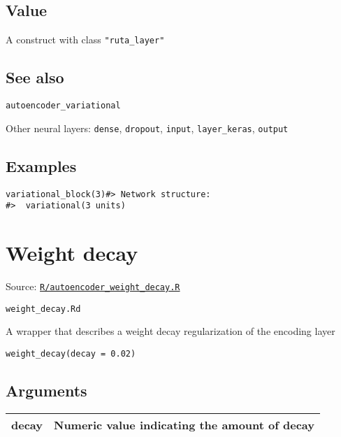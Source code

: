 \hypertarget{value}{\subsection{\texorpdfstring{\protect\hyperlink{value}{}Value}{Value}}\label{value}}

A construct with class \texttt{"ruta\_layer"}

\hypertarget{see-also}{\subsection{\texorpdfstring{\protect\hyperlink{see-also}{}See
also}{See also}}\label{see-also}}

\texttt{autoencoder\_variational}

Other neural layers: \texttt{dense}, \texttt{dropout}, \texttt{input},
\texttt{layer\_keras}, \texttt{output}

\hypertarget{examples}{\subsection{\texorpdfstring{\protect\hyperlink{examples}{}Examples}{Examples}}\label{examples}}

\begin{verbatim}
variational_block(3)#> Network structure:
#>  variational(3 units)
\end{verbatim}

\section{Weight decay}\label{weight-decay}

Source:
\href{https://github.com/fdavidcl/ruta/blob/master/R/autoencoder_weight_decay.R}{\texttt{R/autoencoder\_weight\_decay.R}}

\texttt{weight\_decay.Rd}

A wrapper that describes a weight decay regularization of the encoding
layer

\begin{verbatim}
weight_decay(decay = 0.02)
\end{verbatim}

\hypertarget{arguments}{\subsection{\texorpdfstring{\protect\hyperlink{arguments}{}Arguments}{Arguments}}\label{arguments}}

\begin{longtable}[c]{@{}ll@{}}
\toprule
decay & Numeric value indicating the amount of decay\tabularnewline
\bottomrule
\end{longtable}


